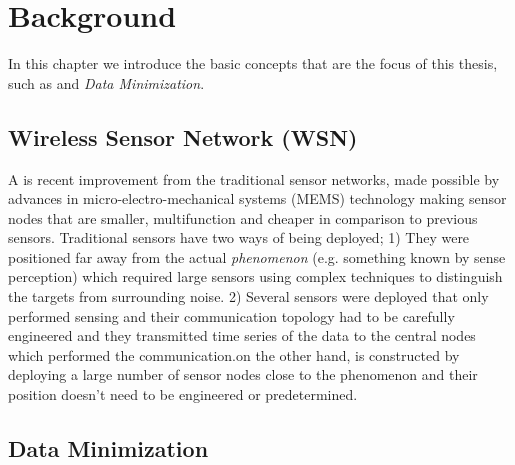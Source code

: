 \chapter{Background}

In this chapter we introduce the basic concepts that are the focus of this thesis, such as \wsn and \textit{Data Minimization}. %


\section{Wireless Sensor Network (WSN)}



A \wsn is recent improvement from the traditional sensor networks, made possible by advances in micro-electro-mechanical systems (MEMS) technology making sensor nodes that are smaller, multifunction and cheaper in comparison to previous sensors. Traditional sensors have two ways of being deployed; 1) They were positioned far away from the actual \textit{phenomenon} (e.g. something known by sense perception) which required large sensors using complex techniques to distinguish the targets from surrounding noise. 2) Several sensors were deployed that only performed sensing and their communication topology had to be carefully engineered and they transmitted time series of the data to the central nodes which performed the communication.\wsns on the other hand, is constructed by deploying a large number of sensor nodes close to the phenomenon and their position doesn't need to be engineered or predetermined.\cite{WSNsurvey} 



\section{Data Minimization}


